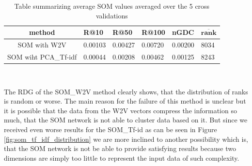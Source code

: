 \begin{table}[h]
\centering
\renewcommand{\arraystretch}{1.5}
\begin{tabu} to 1\textwidth { | c || X[c] | X[c] | X[c] | X[c] | X[c] |}
 \hline
 \textbf{method} & \textbf{R@10} & \textbf{R@50} & \textbf{R@100} & \textbf{nGDC} & $ \boldsymbol{\overline{rank}} $ \\
 \hline
 \hline
 SOM with W2V & 0.00103 & 0.00427 & 0.00720 & 0.00200 & 8034 \\
 \hline
 SOM wiht PCA\_Tf-idf & 0.00044 & 0.00208 & 0.00462 & 0.00125 & 8243 \\
 \hline
\end{tabu} \\
\caption{Table summarizing average SOM values averaged over the 5 cross validations}
\label{table:som}
\end{table}
The RDG of the SOM\_W2V method clearly shows, that the distribution of ranks is random or worse. The main reason for the failure of this method is unclear but it is possible that the data from the W2V vectors compress the information so much, that the SOM network is not able to cluster data based on it. But since we received even worse results for the SOM\_Tf-id as can be seen in Figure \ref{fig:som_tf_idf_distribution} we are more inclined to another possibility which is, that the SOM network is not be able to provide satisfying results because two dimensions are simply too little to represent the input data of such complexity.

